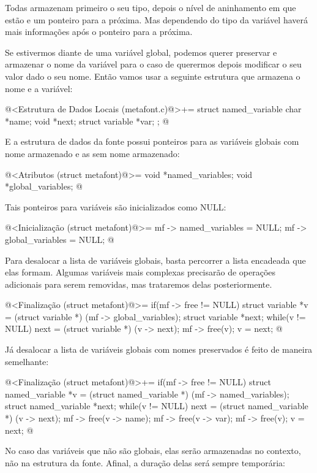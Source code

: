 Todas armazenam primeiro o seu tipo, depois o nível de aninhamento em
que estão e um ponteiro para a próxima. Mas dependendo do tipo da
variável haverá mais informações após o ponteiro para a próxima.

Se estivermos diante de uma variável global, podemos querer preservar
e armazenar o nome da variável para o caso de querermos depois
modificar o seu valor dado o seu nome. Então vamos usar a seguinte
estrutura que armazena o nome e a variável:

\iniciocodigo
@<Estrutura de Dados Locais (metafont.c)@>+=
struct named_variable{
  char *name;
  void *next;
  struct variable *var;
};
@
\fimcodigo

E a estrutura de dados da fonte possui ponteiros para as variáveis
globais com nome armazenado e as sem nome armazenado:

\iniciocodigo
@<Atributos (struct metafont)@>=
  void *named_variables;
  void *global_variables;
@
\fimcodigo

Tais ponteiros para variáveis são inicializados como NULL:

\iniciocodigo
@<Inicialização (struct metafont)@>=
mf -> named_variables = NULL;
mf -> global_variables = NULL;
@
\fimcodigo

Para desalocar a lista de variáveis globais, basta percorrer a lista
encadeada que elas formam. Algumas variáveis mais complexas precisarão
de operações adicionais para serem removidas, mas trataremos delas
posteriormente.

\iniciocodigo
@<Finalização (struct metafont)@>=
if(mf -> free != NULL){
  struct variable *v = (struct variable *) (mf -> global_variables);
  struct variable *next;
  while(v != NULL){
    next = (struct variable *) (v -> next);
    mf -> free(v);
    v = next;
  }
}
@
\fimcodigo

Já desalocar a lista de variáveis globais com nomes preservados é
feito de maneira semelhante:

\iniciocodigo
@<Finalização (struct metafont)@>+=
if(mf -> free != NULL){
  struct named_variable *v = (struct named_variable *)
                                 (mf -> named_variables);
  struct named_variable *next;
  while(v != NULL){
    next = (struct named_variable *) (v -> next);
    mf -> free(v -> name);
    mf -> free(v -> var);
    mf -> free(v);
    v = next;
  }
}
@
\fimcodigo

No caso das variáveis que não são globais, elas serão armazenadas no
contexto, não na estrutura da fonte. Afinal, a duração delas será
sempre temporária:

